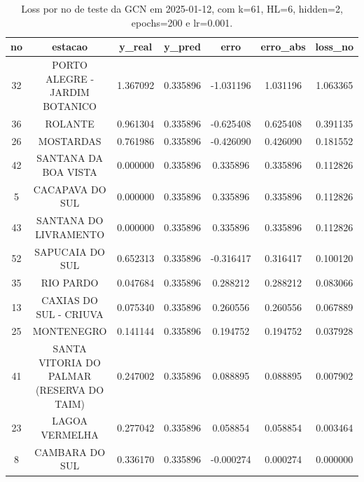 \begin{table}[h]
\centering
\caption{Loss por no de teste da GCN em 2025-01-12, com k=61, HL=6, hidden=2, epochs=200 e lr=0.001.}
\label{tab:gcn_loss_k61_hl6_h2_e200_d20250112}
\begin{tabular}{ccccccc}
\toprule
no & estacao & y\_real & y\_pred & erro & erro\_abs & loss\_no \\
\midrule
32 & PORTO ALEGRE - JARDIM BOTANICO & 1.367092 & 0.335896 & -1.031196 & 1.031196 & 1.063365 \\
36 & ROLANTE & 0.961304 & 0.335896 & -0.625408 & 0.625408 & 0.391135 \\
26 & MOSTARDAS & 0.761986 & 0.335896 & -0.426090 & 0.426090 & 0.181552 \\
42 & SANTANA DA BOA VISTA & 0.000000 & 0.335896 & 0.335896 & 0.335896 & 0.112826 \\
5 & CACAPAVA DO SUL & 0.000000 & 0.335896 & 0.335896 & 0.335896 & 0.112826 \\
43 & SANTANA DO LIVRAMENTO & 0.000000 & 0.335896 & 0.335896 & 0.335896 & 0.112826 \\
52 & SAPUCAIA DO SUL & 0.652313 & 0.335896 & -0.316417 & 0.316417 & 0.100120 \\
35 & RIO PARDO & 0.047684 & 0.335896 & 0.288212 & 0.288212 & 0.083066 \\
13 & CAXIAS DO SUL - CRIUVA & 0.075340 & 0.335896 & 0.260556 & 0.260556 & 0.067889 \\
25 & MONTENEGRO & 0.141144 & 0.335896 & 0.194752 & 0.194752 & 0.037928 \\
41 & SANTA VITORIA DO PALMAR (RESERVA DO TAIM) & 0.247002 & 0.335896 & 0.088895 & 0.088895 & 0.007902 \\
23 & LAGOA VERMELHA & 0.277042 & 0.335896 & 0.058854 & 0.058854 & 0.003464 \\
8 & CAMBARA DO SUL & 0.336170 & 0.335896 & -0.000274 & 0.000274 & 0.000000 \\
\bottomrule
\end{tabular}
\end{table}
